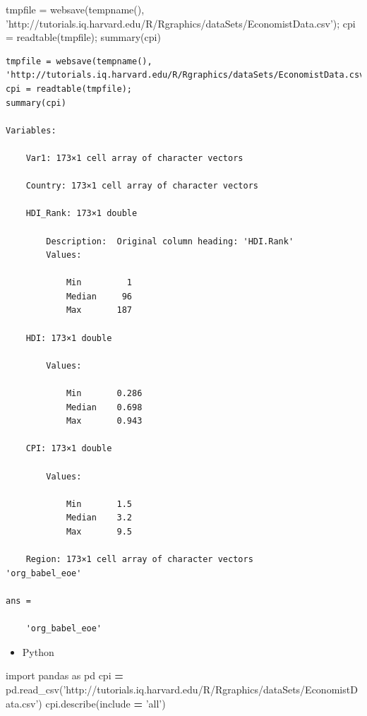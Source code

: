 \documentclass[]{book}
\newenvironment{Shaded}{\begin{snugshade}}{\end{snugshade}}
\newcommand{\StringTok}[1]{\textcolor[rgb]{0.31,0.60,0.02}{#1}}
\newcommand{\ImportTok}[1]{#1}
\newcommand{\OperatorTok}[1]{\textcolor[rgb]{0.81,0.36,0.00}{\textbf{#1}}}
\newcommand{\NormalTok}[1]{#1}
\providecommand{\tightlist}{%
  \setlength{\itemsep}{0pt}\setlength{\parskip}{0pt}}
\begin{document}
\begin{Shaded}
\begin{Highlighting}[]
\NormalTok{tmpfile = websave(tempname(), }\StringTok{'http://tutorials.iq.harvard.edu/R/Rgraphics/dataSets/EconomistData.csv'}\NormalTok{);}
\NormalTok{cpi = readtable(tmpfile);}
\NormalTok{summary(cpi)}
\end{Highlighting}
\end{Shaded}

\begin{verbatim}
tmpfile = websave(tempname(), 'http://tutorials.iq.harvard.edu/R/Rgraphics/dataSets/EconomistData.csv');
cpi = readtable(tmpfile);
summary(cpi)

Variables:

    Var1: 173×1 cell array of character vectors

    Country: 173×1 cell array of character vectors

    HDI_Rank: 173×1 double

        Description:  Original column heading: 'HDI.Rank'
        Values:

            Min         1       
            Median     96       
            Max       187       

    HDI: 173×1 double

        Values:

            Min       0.286
            Median    0.698
            Max       0.943

    CPI: 173×1 double

        Values:

            Min       1.5  
            Median    3.2  
            Max       9.5  

    Region: 173×1 cell array of character vectors
'org_babel_eoe'

ans =

    'org_babel_eoe'
\end{verbatim}

\begin{itemize}
\tightlist
\item
  Python
\end{itemize}

\begin{Shaded}
\begin{Highlighting}[]
\ImportTok{import}\NormalTok{ pandas }\ImportTok{as}\NormalTok{ pd}
\NormalTok{cpi }\OperatorTok{=}\NormalTok{ pd.read_csv(}\StringTok{'http://tutorials.iq.harvard.edu/R/Rgraphics/dataSets/EconomistData.csv'}\NormalTok{)}
\NormalTok{cpi.describe(include }\OperatorTok{=} \StringTok{'all'}\NormalTok{)}
\end{Highlighting}
\end{Shaded}
\end{document}
